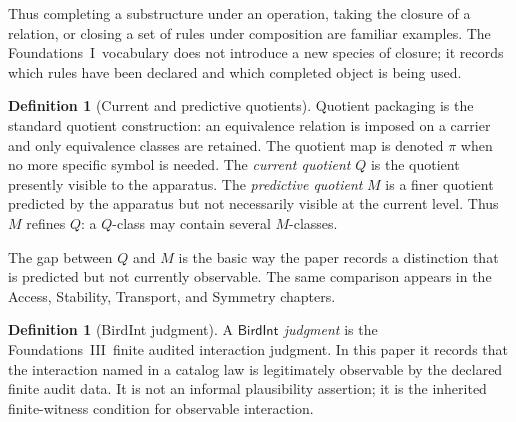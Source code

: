 \documentclass[11pt]{article}
\newcommand{\FoundI}{Foundations~I}
\newcommand{\FoundIII}{Foundations~III}
\newcommand{\currQ}{Q}                 \newcommand{\predM}{M}                 \newcommand{\splitObs}{\Delta}         \newcommand{\quotMap}{\pi}             \newcommand{\accessQ}{q_I}             \newcommand{\obsSig}{\sigma_I}         \newcommand{\closureForm}{\mathsf{cl}} \newcommand{\BirdInt}{\mathsf{BirdInt}}
\theoremstyle{definition}
\newtheorem{definition}[theorem]{Definition}
\begin{document}
Thus completing a substructure under an operation, taking the closure
of a relation, or closing a set of rules under composition are familiar
examples.  The \FoundI\ vocabulary does not introduce a new species of
closure; it records which rules have been declared and which completed
object is being used.

\begin{definition}[Current and predictive quotients]\label{def:quotient-packaging}
Quotient packaging is the standard quotient construction: an
equivalence relation is imposed on a carrier and only equivalence
classes are retained.  The quotient map is denoted \(\quotMap\) when no
more specific symbol is needed.  The \emph{current quotient}
\(\currQ\) is the quotient presently visible to the apparatus.  The
\emph{predictive quotient} \(\predM\) is a finer quotient predicted by
the apparatus but not necessarily visible at the current level.  Thus
\(\predM\) refines \(\currQ\): a \(\currQ\)-class may contain several
\(\predM\)-classes.
\end{definition}

The gap between \(\currQ\) and \(\predM\) is the basic way the paper
records a distinction that is predicted but not currently observable.
The same comparison appears in the Access, Stability, Transport, and
Symmetry chapters.

\begin{definition}[BirdInt judgment]\label{def:birdint}
A \emph{\(\BirdInt\) judgment} is the \FoundIII\ finite audited
interaction judgment.  In this paper it records that the interaction
named in a catalog law is legitimately observable by the declared
finite audit data.  It is not an informal plausibility assertion; it is
the inherited finite-witness condition for observable interaction.
\end{definition}
\end{document}
